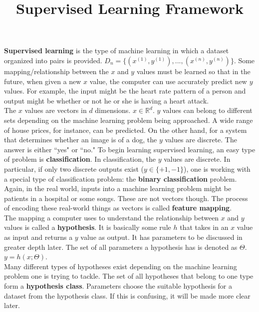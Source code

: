 \documentclass{article}
\title{Supervised Learning Framework}
\author{}
\date{}
\begin{document}
\maketitle
\textbf{Supervised learning} is the type of machine learning in which a dataset organized into pairs is provided. $D_n = \{(x^{(1)}, y^{(1)}), ... , (x^{(n)}, y^{(n)})\}$. Some mapping/relationship between the $x$ and $y$ values must be learned so that in the future, when given a new $x$ value, the computer can use accurately predict new $y$ values. For example, the input might be the heart rate pattern of a person and output might be whether or not he or she is having a heart attack. \\

The $x$ values are vectors in $d$ dimensions. $x \in \mathbb{R}^d$. $y$ values can belong to different sets depending on the machine learning problem being approached. A wide range of house prices, for instance, can be predicted. On the other hand, for a system that determines whether an image is of a dog, the $y$ values are discrete. The answer is either  ``yes" or ``no." To begin learning supervised learning, an easy type of problem is \textbf{classification}. In classification, the $y$ values are discrete. In particular, if only two discrete outputs exist ($y \in \{+1, -1\}$), one is working with a special type of classification problem: the \textbf{binary classification} problem. \\

Again, in the real world, inputs into a machine learning problem might be patients in a hospital or some songs. These are not vectors though. The process of encoding these real-world things as vectors is called \textbf{feature mapping}. \\

The mapping a computer uses to understand the relationship between $x$ and $y$ values is called a \textbf{hypothesis}. It is basically some rule $h$ that takes in an $x$ value as input and returns a $y$ value as output. It has parameters to be discussed in greater depth later. The set of all parameters a hypothesis has is denoted as $\Theta$. $y=h(x; \Theta)$. \\

Many different types of hypotheses exist depending on the machine learning problem one is trying to tackle. The set of all hypotheses that belong to one type form a \textbf{hypothesis class}. Parameters choose the suitable hypothesis for a dataset from the hypothesis class. If this is confusing, it will be made more clear later. \\
\end{document}
